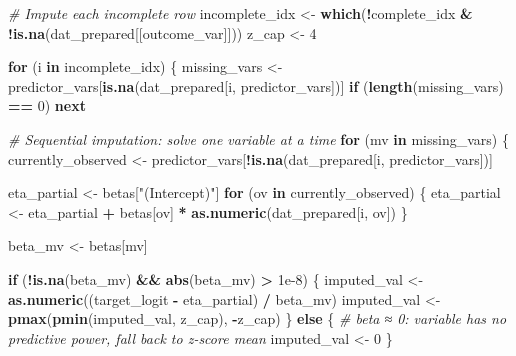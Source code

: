\documentclass[
]{article}
\newenvironment{Shaded}{\begin{snugshade}}{\end{snugshade}}
\newcommand{\CommentTok}[1]{\textcolor[rgb]{0.56,0.35,0.01}{\textit{#1}}}
\newcommand{\ControlFlowTok}[1]{\textcolor[rgb]{0.13,0.29,0.53}{\textbf{#1}}}
\newcommand{\DecValTok}[1]{\textcolor[rgb]{0.00,0.00,0.81}{#1}}
\newcommand{\FloatTok}[1]{\textcolor[rgb]{0.00,0.00,0.81}{#1}}
\newcommand{\FunctionTok}[1]{\textcolor[rgb]{0.13,0.29,0.53}{\textbf{#1}}}
\newcommand{\NormalTok}[1]{#1}
\newcommand{\OtherTok}[1]{\textcolor[rgb]{0.56,0.35,0.01}{#1}}
\newcommand{\SpecialCharTok}[1]{\textcolor[rgb]{0.81,0.36,0.00}{\textbf{#1}}}
\newcommand{\StringTok}[1]{\textcolor[rgb]{0.31,0.60,0.02}{#1}}
\begin{document}
\begin{Shaded}
\begin{Highlighting}[]
      \CommentTok{\# Impute each incomplete row}
\NormalTok{      incomplete\_idx }\OtherTok{\textless{}{-}} \FunctionTok{which}\NormalTok{(}\SpecialCharTok{!}\NormalTok{complete\_idx }\SpecialCharTok{\&} \SpecialCharTok{!}\FunctionTok{is.na}\NormalTok{(dat\_prepared[[outcome\_var]]))}
\NormalTok{      z\_cap }\OtherTok{\textless{}{-}} \DecValTok{4}
      
      \ControlFlowTok{for}\NormalTok{ (i }\ControlFlowTok{in}\NormalTok{ incomplete\_idx) \{}
\NormalTok{        missing\_vars }\OtherTok{\textless{}{-}}\NormalTok{ predictor\_vars[}\FunctionTok{is.na}\NormalTok{(dat\_prepared[i, predictor\_vars])]}
        \ControlFlowTok{if}\NormalTok{ (}\FunctionTok{length}\NormalTok{(missing\_vars) }\SpecialCharTok{==} \DecValTok{0}\NormalTok{) }\ControlFlowTok{next}
        
        \CommentTok{\# Sequential imputation: solve one variable at a time}
        \ControlFlowTok{for}\NormalTok{ (mv }\ControlFlowTok{in}\NormalTok{ missing\_vars) \{}
\NormalTok{          currently\_observed }\OtherTok{\textless{}{-}}\NormalTok{ predictor\_vars[}\SpecialCharTok{!}\FunctionTok{is.na}\NormalTok{(dat\_prepared[i, predictor\_vars])]}
          
\NormalTok{          eta\_partial }\OtherTok{\textless{}{-}}\NormalTok{ betas[}\StringTok{"(Intercept)"}\NormalTok{]}
          \ControlFlowTok{for}\NormalTok{ (ov }\ControlFlowTok{in}\NormalTok{ currently\_observed) \{}
\NormalTok{            eta\_partial }\OtherTok{\textless{}{-}}\NormalTok{ eta\_partial }\SpecialCharTok{+}\NormalTok{ betas[ov] }\SpecialCharTok{*} \FunctionTok{as.numeric}\NormalTok{(dat\_prepared[i, ov])}
\NormalTok{          \}}
          
\NormalTok{          beta\_mv }\OtherTok{\textless{}{-}}\NormalTok{ betas[mv]}
          
          \ControlFlowTok{if}\NormalTok{ (}\SpecialCharTok{!}\FunctionTok{is.na}\NormalTok{(beta\_mv) }\SpecialCharTok{\&\&} \FunctionTok{abs}\NormalTok{(beta\_mv) }\SpecialCharTok{\textgreater{}} \FloatTok{1e{-}8}\NormalTok{) \{}
\NormalTok{            imputed\_val }\OtherTok{\textless{}{-}} \FunctionTok{as.numeric}\NormalTok{((target\_logit }\SpecialCharTok{{-}}\NormalTok{ eta\_partial) }\SpecialCharTok{/}\NormalTok{ beta\_mv)}
\NormalTok{            imputed\_val }\OtherTok{\textless{}{-}} \FunctionTok{pmax}\NormalTok{(}\FunctionTok{pmin}\NormalTok{(imputed\_val, z\_cap), }\SpecialCharTok{{-}}\NormalTok{z\_cap)}
\NormalTok{          \} }\ControlFlowTok{else}\NormalTok{ \{}
            \CommentTok{\# beta ≈ 0: variable has no predictive power, fall back to z{-}score mean}
\NormalTok{            imputed\_val }\OtherTok{\textless{}{-}} \DecValTok{0}
\NormalTok{          \}}
          

\end{Highlighting}
\end{Shaded}
\end{document}
